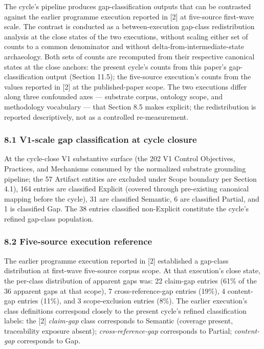 \documentclass[
]{article}
\begin{document}
The cycle's pipeline produces gap-classification outputs that can be
contrasted against the earlier programme execution reported in {[}2{]}
at five-source first-wave scale. The contrast is conducted as a
between-execution gap-class redistribution analysis at the close states
of the two executions, without scaling either set of counts to a common
denominator and without delta-from-intermediate-state archaeology. Both
sets of counts are recomputed from their respective canonical states at
the close anchors: the present cycle's counts from this paper's
gap-classification output (Section 11.5); the five-source execution's
counts from the values reported in {[}2{]} at the published-paper scope.
The two executions differ along three confounded axes --- substrate
corpus, ontology scope, and methodology vocabulary --- that Section 8.5
makes explicit; the redistribution is reported descriptively, not as a
controlled re-measurement.

\subsubsection{8.1 V1-scale gap classification at cycle
closure}\label{v1-scale-gap-classification-at-cycle-closure}

At the cycle-close V1 substantive surface (the 202 V1 Control
Objectives, Practices, and Mechanisms consumed by the normalized
substrate grounding pipeline; the 57 Artifact entities are excluded
under Scope boundary per Section 4.1), 164 entries are classified
Explicit (covered through pre-existing canonical mapping before the
cycle), 31 are classified Semantic, 6 are classified Partial, and 1 is
classified Gap. The 38 entries classified non-Explicit constitute the
cycle's refined gap-class population.

\subsubsection{8.2 Five-source execution
reference}\label{five-source-execution-reference}

The earlier programme execution reported in {[}2{]} established a
gap-class distribution at first-wave five-source corpus scope. At that
execution's close state, the per-class distribution of apparent gaps
was: 22 claim-gap entries (61\% of the 36 apparent gaps at that scope),
7 cross-reference-gap entries (19\%), 4 content-gap entries (11\%), and
3 scope-exclusion entries (8\%). The earlier execution's class
definitions correspond closely to the present cycle's refined
classification labels: the {[}2{]} \emph{claim-gap} class corresponds to
Semantic (coverage present, traceability exposure absent);
\emph{cross-reference-gap} corresponds to Partial; \emph{content-gap}
corresponds to Gap.
\end{document}
